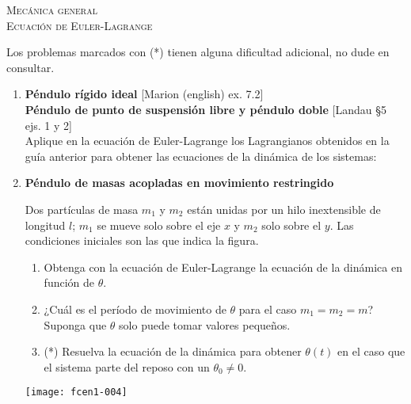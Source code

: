 \documentclass[11pt,spanish,a4paper]{article}
\begin{document}
\begin{center}
  \textsc{\large Mecánica general}\\
  \textsc{\large Ecuación de Euler-Lagrange}
\end{center}

\noindent
Los problemas marcados con (*) tienen alguna dificultad adicional, no dude en consultar.
\begin{enumerate}


\item \textbf{Péndulo rígido ideal} [Marion (english) ex. 7.2] \\
	\textbf{Péndulo de punto de suspensión libre y péndulo doble} [Landau \S5 ejs. 1 y 2]\\ 
Aplique en la ecuación de Euler-Lagrange los Lagrangianos obtenidos en la guía anterior para obtener las ecuaciones de la dinámica de los sistemas:\\



\item \textbf{Péndulo de masas acopladas en movimiento restringido}\\ 
\begin{minipage}[t][5.3cm]{0.6\textwidth}
Dos partículas de masa \(m_1\) y \(m_2\) están unidas por un hilo inextensible de longitud \(l\); \(m_1\) se mueve solo sobre el eje \(x\) y \(m_2\) solo sobre el \(y\).
Las condiciones iniciales son las que indica la figura.
\begin{enumerate}
	\item Obtenga con la ecuación de Euler-Lagrange la ecuación de la dinámica en función de \(\theta\).
	\item ¿Cuál es el período de movimiento de \(\theta\) para el caso \(m_1 = m_2 = m\)?
	Suponga que \(\theta\) solo puede tomar valores pequeños.
	\item (*) Resuelva la ecuación de la dinámica para obtener \(\theta(t)\) en el caso que el sistema parte del reposo con un \(\theta_0 \neq 0\).
\end{enumerate}
\end{minipage}
\begin{minipage}[c][2em][t]{0.4\textwidth}
	\hspace{0.5cm}
   \texttt{[image: fcen1-004]}
\end{minipage}




\end{enumerate}
\end{document}
